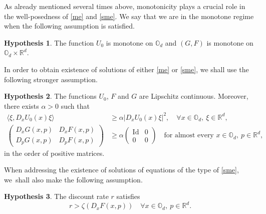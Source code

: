 \documentclass[10pt]{amsart}
\DeclareMathOperator{\Id}{Id}
\theoremstyle{definition}
\newtheorem{hyp}{Hypothesis}
\begin{document}
As already mentioned several times above, monotonicity plays a crucial role in the well-posedness of \eqref{me} and \eqref{sme}. We say that we are in the monotone regime when the following assumption is satisfied.
\begin{hyp}\label{mon}
The function $U_0$ is monotone on $\mathbb{O}_d$ and $(G,F)$ is monotone on $\mathbb{O}_d \times \mathbb{R}^d$.
\end{hyp}
In order to obtain existence of solutions of either \eqref{me} or \eqref{sme}, we shall use the following stronger assumption.
\begin{hyp}\label{smooth}
The functions $U_0$, $F$ and $G$ are Lipschitz continuous. Moreover, there exists $\alpha > 0$ such that
\begin{align*}
\langle \xi, D_x U_0(x) \xi\rangle &\geq \alpha |D_xU_0(x)\xi|^2,\quad \forall x \in \mathbb{O}_d,\ \xi \in \mathbb{R}^d,
\\
\begin{pmatrix}
D_x G(x,p) & D_x F(x,p) \\
D_p G(x,p) & D_p F(x,p)
\end{pmatrix}&\geq \alpha \begin{pmatrix}
\Id & 0 \\
0 & 0
\end{pmatrix} \quad\text{for almost every } x \in \mathbb{O}_d,\ p \in \mathbb{R}^d,
\end{align*}
in the order of positive matrices.
\end{hyp}
When addressing the existence of solutions of equations of the type of \eqref{sme}, we~shall also make the following assumption.
\begin{hyp}\label{strongstat}
The discount rate $r$ satisfies
\begin{equation*}
r > \zeta(D_xF(x,p))\quad \forall x \in \mathbb{O}_d,\ p \in \mathbb{R}^d.
\end{equation*}
\end{hyp}
\end{document}
